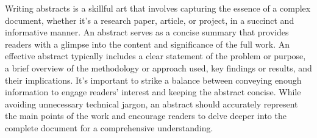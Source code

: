 \setlength{\parindent}{0pt}
\normalsize

Writing abstracts is a skillful art that involves capturing the essence of a complex document, whether it's a research paper, article, or project, in a succinct and informative manner. An abstract serves as a concise summary that provides readers with a glimpse into the content and significance of the full work. An effective abstract typically includes a clear statement of the problem or purpose, a brief overview of the methodology or approach used, key findings or results, and their implications. It's important to strike a balance between conveying enough information to engage readers' interest and keeping the abstract concise. While avoiding unnecessary technical jargon, an abstract should accurately represent the main points of the work and encourage readers to delve deeper into the complete document for a comprehensive understanding.


